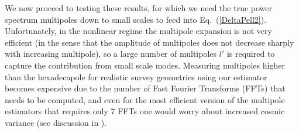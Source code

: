                                                                                                                                                                                                                                                                             We now proceed to testing these results, for which we need the true power spectrum multipoles down to small scales to feed into Eq.~(\ref{DeltaPell2}). Unfortunately, in the nonlinear regime the multipole expansion is not very efficient (in the sense that the amplitude of multipoles does not decrease sharply with increasing multipole), so a large number of multipoles $l'$ is required to capture the contribution from small scale modes.  Measuring multipoles higher than the hexadecapole for realistic survey geometries  using our estimator becomes expensive due to the number of 
                                                                                                                                                                                                                                                                            Fast Fourier Transforms (FFTs) that needs to be computed, and even for the most efficient version of the multipole estimators that requires only 7 FFTs one would worry about increased cosmic variance (see discussion in \citealt{Scoccimarro:2015aa}). 

